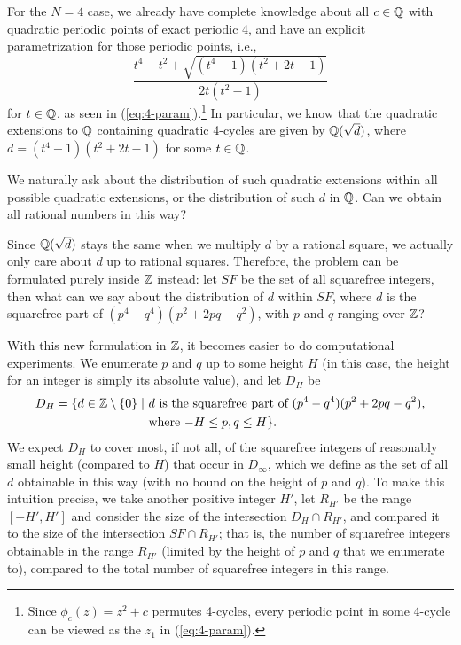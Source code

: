 For the $N = 4$ case, we already have complete knowledge about all $c
\in \mathbb{Q}$ with quadratic periodic points of exact periodic 4, and have
an explicit parametrization for those periodic points, i.e.,
\[
\frac{t^4 - t^2 + \sqrt{(t^4 - 1)(t^2 + 2t - 1)}}{2t(t^2 - 1)}
\]
for $t \in \mathbb{Q}$, as seen in (\ref{eq:4-param}).\footnote{%
  Since $\phi_c(z) = z^2 + c$ permutes 4-cycles, every periodic point
  in some 4-cycle can be viewed as the $z_1$ in (\ref{eq:4-param}).}
In particular, we know that the quadratic extensions to $\mathbb{Q}$
containing quadratic 4-cycles are given by $\mathbb{Q}(\sqrt{d})$, where $d =
(t^4 - 1)(t^2 + 2t - 1)$ for some $t \in \mathbb{Q}$.

We naturally ask about the distribution of such quadratic extensions
within all possible quadratic extensions, or the distribution of such
$d$ in $\mathbb{Q}$. Can we obtain all rational numbers in this way?

Since $\mathbb{Q}(\sqrt{d})$ stays the same when we multiply $d$ by a rational
square, we actually only care about $d$ up to rational
squares. Therefore, the problem can be formulated purely inside $\mathbb{Z}$
instead: let $SF$ be the set of all squarefree integers, then what can
we say about the distribution of $d$ within $SF$, where $d$ is the
squarefree part of $(p^4 - q^4)(p^2 + 2pq - q^2)$, with $p$ and $q$
ranging over $\mathbb{Z}$?

With this new formulation in $\mathbb{Z}$, it becomes easier to do
computational experiments. We enumerate $p$ and $q$ up to some height
$H$ (in this case, the height for an integer is simply its absolute
value), and let $D_H$ be
\[
\begin{aligned}
  D_H = \{ d \in \mathbb{Z} \setminus \left\{0\right\} \mid\ &
  \text{$d$ is the squarefree part of $(p^4 - q^4)(p^2 + 2pq - q^2)$},
  \\
  & \text{where $-H \le p, q \le H$}\}.
\end{aligned}
\]
We expect $D_H$ to cover most, if not all, of the squarefree integers
of reasonably small height (compared to $H$) that occur in $D_\infty$,
which we define as the set of all $d$ obtainable in this way (with no
bound on the height of $p$ and $q$). To make this intuition precise,
we take another positive integer $H'$, let $R_{H'}$ be the range
$[-H', H']$ and consider the size of the intersection $D_H \cap
R_{H'}$, and compared it to the size of the intersection $SF \cap
R_{H'}$; that is, the number of squarefree integers obtainable in the
range $R_{H'}$ (limited by the height of $p$ and $q$ that we enumerate
to), compared to the total number of squarefree integers in this
range.

